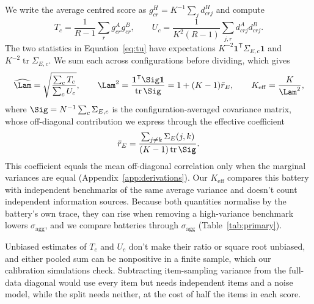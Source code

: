 We write the average centred score as $g^H_{cr}=K^{-1}\sum_j d^H_{crj}$ and compute
\begin{equation}
T_c=\frac{1}{R-1}\sum_r g^A_{cr}g^B_{cr},\qquad
U_c=\frac{1}{K^2(R-1)}\sum_{j,r}d^A_{crj}d^B_{crj}.
\label{eq:tu}
\end{equation}
The two statistics in Equation~\ref{eq:tu} have expectations $K^{-2}\mathbf{1}^{\mathsf T}\Sigma_{E,c}\mathbf{1}$ and $K^{-2}\operatorname{tr}\Sigma_{E,c}$. We sum each across configurations before dividing, which gives
\begin{equation}
\widehat\Lam=\sqrt{\frac{\sum_c T_c}{\sum_c U_c}},\qquad
\Lam^2=\frac{\mathbf{1}^{\mathsf T}\Sig\mathbf{1}}{\operatorname{tr}\Sig}
=1+(K-1)\bar r_E,\qquad K_{\mathrm{eff}}=\frac{K}{\Lam^2},
\label{eq:lambda}
\end{equation}
where $\Sig=N^{-1}\sum_c\Sigma_{E,c}$ is the configuration-averaged covariance matrix, whose off-diagonal contribution we express through the effective coefficient
\begin{equation}
\bar r_E=\frac{\sum_{j\ne k}\Sigma_E(j,k)}{(K-1)\operatorname{tr}\Sig}.
\label{eq:effective}
\end{equation}
This coefficient equals the mean off-diagonal correlation only when the marginal variances are equal (Appendix~\ref{app:derivations}). Our $K_{\mathrm{eff}}$ compares this battery with independent benchmarks of the same average variance and doesn't count independent information sources. Because both quantities normalise by the battery's own trace, they can rise when removing a high-variance benchmark lowers $\sigma_{\mathrm{agg}}$, and we compare batteries through $\sigma_{\mathrm{agg}}$ (Table~\ref{tab:primary}).

Unbiased estimates of $T_c$ and $U_c$ don't make their ratio or square root unbiased, and either pooled sum can be nonpositive in a finite sample, which our calibration simulations check. Subtracting item-sampling variance from the full-data diagonal would use every item but needs independent items and a noise model, while the split needs neither, at the cost of half the items in each score.

